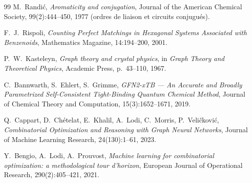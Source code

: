 \documentclass[11pt,a4paper]{article}
\begin{document}
\begin{thebibliography}{99}
 M.~Randić,
\emph{Aromaticity and conjugation}, Journal of the American Chemical Society,
99(2):444--450, 1977 (ordres de liaison et circuits conjugués).

 F.~J.~Rispoli,
\emph{Counting Perfect Matchings in Hexagonal Systems Associated with
Benzenoids}, Mathematics Magazine, 14:194--200, 2001.

 P.~W.~Kasteleyn,
\emph{Graph theory and crystal physics}, in \emph{Graph Theory and Theoretical
Physics}, Academic Press, p.~43--110, 1967.

 C.~Bannwarth, S.~Ehlert, S.~Grimme,
\emph{GFN2-xTB — An Accurate and Broadly Parametrized Self-Consistent
Tight-Binding Quantum Chemical Method}, Journal of Chemical Theory and
Computation, 15(3):1652--1671, 2019.

 Q.~Cappart, D.~Chételat, E.~Khalil, A.~Lodi,
C.~Morris, P.~Veličković,
\emph{Combinatorial Optimization and Reasoning with Graph Neural Networks},
Journal of Machine Learning Research, 24(130):1--61, 2023.

 Y.~Bengio, A.~Lodi, A.~Prouvost,
\emph{Machine learning for combinatorial optimization: a methodological
tour d'horizon}, European Journal of Operational Research, 290(2):405--421,
2021.

\end{thebibliography}
\end{document}
